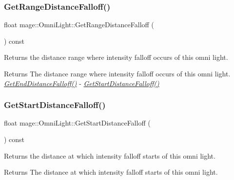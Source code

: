 \subsubsection{\texorpdfstring{Get\+Range\+Distance\+Falloff()}{GetRangeDistanceFalloff()}}
{\footnotesize\ttfamily float mage\+::\+Omni\+Light\+::\+Get\+Range\+Distance\+Falloff (\begin{DoxyParamCaption}{ }\end{DoxyParamCaption}) const\hspace{0.3cm}{\ttfamily [noexcept]}}

Returns the distance range where intensity falloff occurs of this omni light.

\begin{DoxyReturn}{Returns}
The distance range where intensity falloff occurs of this omni light. {\itshape \hyperlink{classmage_1_1_omni_light_a1bd4d9eb6a22ae78e1780f142039611c}{Get\+End\+Distance\+Falloff()}} -\/ {\itshape \hyperlink{classmage_1_1_omni_light_adb7811b447e8b4679b21123c01c6d6fb}{Get\+Start\+Distance\+Falloff()}} 
\end{DoxyReturn}
\hypertarget{classmage_1_1_omni_light_adb7811b447e8b4679b21123c01c6d6fb}{}\label{classmage_1_1_omni_light_adb7811b447e8b4679b21123c01c6d6fb} 
\subsubsection{\texorpdfstring{Get\+Start\+Distance\+Falloff()}{GetStartDistanceFalloff()}}
{\footnotesize\ttfamily float mage\+::\+Omni\+Light\+::\+Get\+Start\+Distance\+Falloff (\begin{DoxyParamCaption}{ }\end{DoxyParamCaption}) const\hspace{0.3cm}{\ttfamily [noexcept]}}

Returns the distance at which intensity falloff starts of this omni light.

\begin{DoxyReturn}{Returns}
The distance at which intensity falloff starts of this omni light. 
\end{DoxyReturn}
\hypertarget{classmage_1_1_omni_light_a7bdce151d327daef5e1f31daedcc4627}{}\label{classmage_1_1_omni_light_a7bdce151d327daef5e1f31daedcc4627} 

